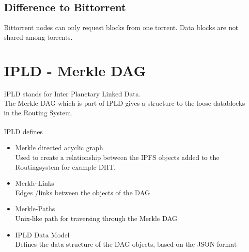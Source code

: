 \documentclass[a4paper,11pt, oneside]{report}
\theoremstyle{definition}
\begin{document}
\subsection{Difference to Bittorrent}

Bittorrent nodes can only request blocks from one torrent. Data blocks are not shared among torrents.


\newpage

\section{IPLD - Merkle DAG}
IPLD stands for Inter Planetary Linked Data. \\ 
The Merkle DAG which is part of IPLD gives a structure to the loose datablocks in the Routing System.\\ \\
IPLD defines
\begin{itemize}
\item Merkle directed acyclic graph\\ Used to create a relationship between the IPFS objects added to the Routingsystem for example DHT. 
\item Merkle-Links \\ Edges /links  between the objects of the DAG
\item Merkle-Paths \\ Unix-like path for traversing through the Merkle DAG
\item IPLD Data Model \\ Defines the data structure of the DAG objects, based on the JSON format
\end{itemize}
\end{document}
